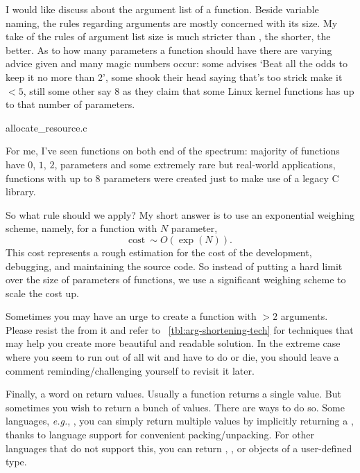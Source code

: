 I would like discuss about the argument list of a function.
Beside variable naming,
the rules regarding arguments are mostly concerned with its size.
My take of the rules of argument list size is much stricter than , the shorter, the better.
As to how many parameters a function should have there are varying advice given and many magic
numbers occur: some advises `Beat all the odds to keep it no more than 2', some shook their head
saying that's too strick make it $<5$, still some other say $8$ as they claim that some Linux
kernel functions has up to that number of parameters.

\begin{clisting}
    
    {allocate_resource.c}
\end{clisting}

For me, I've seen functions on both end of the spectrum: majority of functions have $0$, $1$, $2$,
parameters and some extremely rare but real-world applications, functions with up to $8$
parameters were created just to make use of a legacy C library.

So what rule should we apply?
My short answer is to use an exponential weighing scheme, namely, for a function
with $N$ parameter,
\begin{equation}
    \mbox{cost}~\sim O(\exp(N)).
\end{equation}
This cost represents a rough estimation for the cost of the development, debugging, and maintaining
the source code.
So instead of putting a hard limit over the size of parameters of functions, we use a significant
weighing scheme to scale the cost up.

Sometimes you may have an urge to create a function with $>2$ arguments.
Please resist the from it and refer to ~\autoref{tbl:arg-shortening-tech} for techniques that may
help you create more beautiful and readable solution.
In the extreme case where you seem to run out of all wit and have to do or die,
you should leave a comment reminding/challenging yourself to revisit it later.


Finally, a word on return values.
Usually a function returns a single value.
But sometimes you wish to return a bunch of values.
There are ways to do so.
Some languages, \textit{e.g.}, \python, you can simply return multiple values by implicitly
returning a , thanks to language support for convenient packing/unpacking.
For other languages that do not support this, you can return , , or
objects of a user-defined type.

